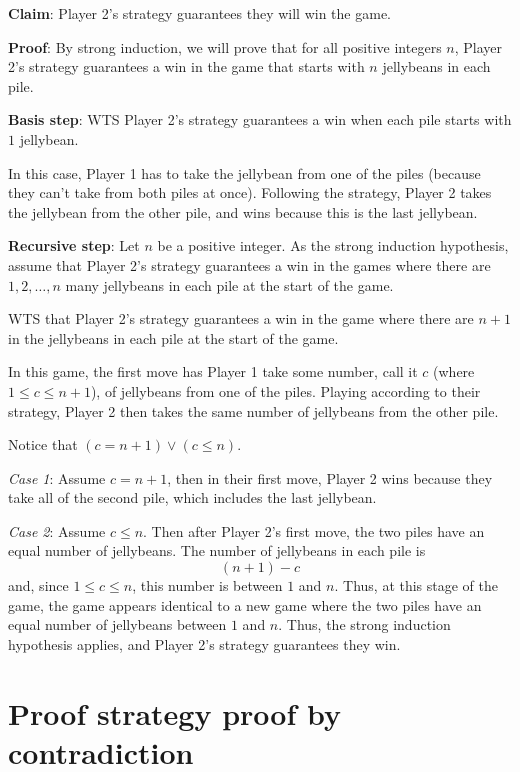 \documentclass[12pt, oneside]{article}
\begin{document}
{\bf Claim}: Player 2's strategy guarantees they will win the game.

{\bf Proof}: By strong induction, we will prove that for all positive 
integers $n$, Player 2's strategy guarantees a win in the game that starts with 
$n$ jellybeans in each pile.

{\bf Basis step}: WTS Player 2's strategy guarantees a win 
when each pile starts with $1$ jellybean.

In this case, Player 1 has to take the jellybean from one of the piles
(because they can't take from both piles at once).
Following the strategy, Player 2 takes the jellybean from the 
other pile, and wins because this is the last jellybean.

{\bf Recursive step}: Let $n$ be a positive integer. 
As the strong induction hypothesis, assume that
Player 2's strategy guarantees a win in the games 
where there are $1, 2, \ldots, n$ many jellybeans in each 
pile at the start of the game.

WTS that Player 2's strategy guarantees a win in the game where
there are $n+1$ in the jellybeans in each pile at the start of the game.

In this game, the first move has Player 1 take 
some number, call it $c$ (where $1 \leq c \leq n+1$),
of jellybeans from one of the piles. 
Playing according to their strategy, Player 2 then 
takes the same number of jellybeans from  the other pile.

Notice that $(c = n+1) \lor (c \leq n)$.

{\it Case 1}: Assume $c = n+1$, then in their first move, 
Player 2 wins because they take all of the second pile, which 
includes the last jellybean.

{\it Case 2}: Assume $c \leq n$. Then after Player 2's first move,
the two piles have an equal number of jellybeans. The number
of jellybeans in each pile is 
\[
    (n+1) - c
\]
and, since $1 \leq c \leq n$, this number is between $1$ and $n$.
Thus, at this stage of the game, the game appears identical to a new 
game where the two piles have an equal number of jellybeans between $1$
and $n$. Thus, the strong induction hypothesis applies, and Player 2's
strategy guarantees they win.

 \vfill
\section*{Proof strategy proof by contradiction}


\end{document}
